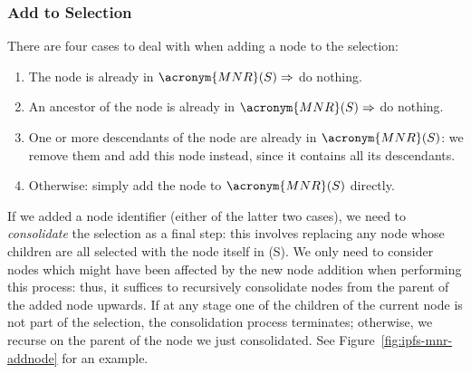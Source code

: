 \subsubsection{Add to Selection}

There are four cases to deal with when adding a node to the selection:

\begin{enumerate}

\item The node is already in $\acronym{MNR}(S) \Rightarrow $ do nothing.

\item An ancestor of the node is already in $\acronym{MNR}(S) \Rightarrow $ do nothing.

\item One or more descendants of the node are already in $\acronym{MNR}(S)$: we remove them and add this node instead, since it contains all its descendants.

\item Otherwise: simply add the node to $\acronym{MNR}(S)$ directly.

\end{enumerate}

If we added a node identifier (either of the latter two cases), we need to \emph{consolidate} the selection as a final step: this involves replacing any node whose children are all selected with the node itself in (S). We only need to consider nodes which might have been affected by the new node addition when performing this process: thus, it suffices to recursively consolidate nodes from the parent of the added node upwards. If at any stage one of the children of the current node is not part of the selection, the consolidation process terminates; otherwise, we recurse on the parent of the node we just consolidated. See Figure~\ref{fig:ipfs-mnr-addnode} for an example.

